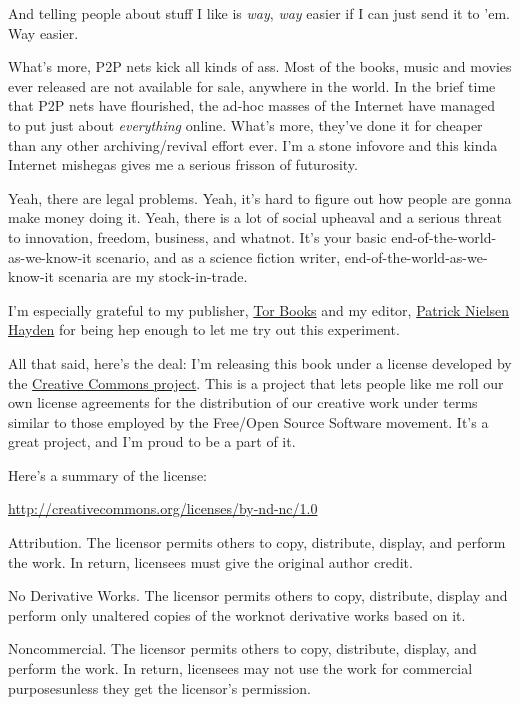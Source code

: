And telling people about stuff I like is \emph{way}, \emph{way}
easier if I can just send it to 'em. Way easier.

What's more, P2P nets kick all kinds of ass. Most of the books,
music and movies ever released are not available for sale, anywhere
in the world. In the brief time that P2P nets have flourished, the
ad-hoc masses of the Internet have managed to put just about
\emph{everything} online. What's more, they've done it for cheaper
than any other archiving/revival effort ever. I'm a stone infovore
and this kinda Internet mishegas gives me a serious frisson of
futurosity.

Yeah, there are legal problems. Yeah, it's hard to figure out how
people are gonna make money doing it. Yeah, there is a lot of
social upheaval and a serious threat to innovation, freedom,
business, and whatnot. It's your basic
end-of-the-world-as-we-know-it scenario, and as a science fiction
writer, end-of-the-world-as-we-know-it scenaria are my
stock-in-trade.

I'm especially grateful to my publisher,
\href{http://www.tor.com/}{Tor Books} and my editor,
\href{http://nielsenhayden.com/electrolite}{Patrick Nielsen Hayden}
for being hep enough to let me try out this experiment.

All that said, here's the deal: I'm releasing this book under a
license developed by the 
\href{http://creativecommons.org/}{Creative Commons project}.
This is a project that lets people like me roll our own license
agreements for the distribution of our creative work under terms
similar to those employed by the Free/Open Source Software
movement. It's a great project, and I'm proud to be a part of it.

Here's a summary of the license:

\href{http://creativecommons.org/licenses/by-nd-nc/1.0}{http://creativecommons.org/licenses/by-nd-nc/1.0}

Attribution. The licensor permits others to copy, distribute,
display, and perform the work. In return, licensees must give the
original author credit.

No Derivative Works. The licensor permits others to copy,
distribute, display and perform only unaltered copies of the
work{\dash}not derivative works based on it.

Noncommercial. The licensor permits others to copy, distribute,
display, and perform the work. In return, licensees may not use the
work for commercial purposes{\dash}unless they get the licensor's
permission.

